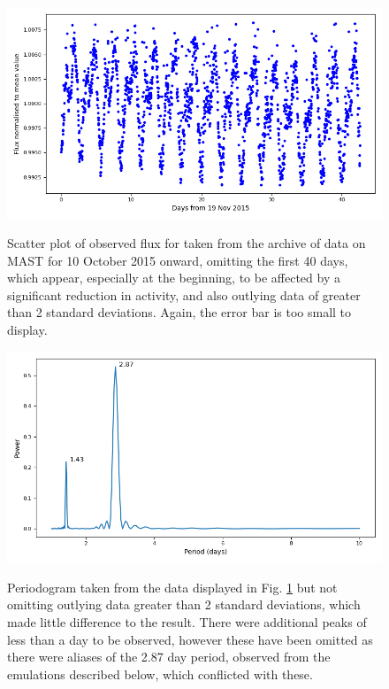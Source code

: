 \begin{figure}[!htbp]
\begin{center}
\includegraphics[scale=0.40]{k2/images/k2lcurve.png} \\
\vspace{-.5cm}
\end{center}   
\caption{Scatter plot of observed flux for {\ross} taken from the archive of
{\ktwo} data on MAST for 10 October 2015 onward, omitting the first 40 days,
which appear, especially at the beginning, to be affected by a significant
reduction in activity, and also outlying data of greater than 2 standard deviations.
Again, the error bar is too small to display.}\protect\label{fig:k2lcurve}
\end{figure}

\begin{figure}[!htbp]
\begin{center}
\includegraphics[scale=0.40]{k2/images/k2_pg.png} \\
\vspace{-.5cm}
\end{center}   
\caption{Periodogram taken from the data displayed in Fig.
\ref{fig:k2lcurve} but not omitting outlying data
greater than 2 standard deviations, which made
little difference to the result. There were additional peaks of less than a day
to be observed, however these have been omitted as there were aliases of the
2.87 day period, observed from the emulations described below, which conflicted
with these.} \protect\label{fig:k2pgram}
\end{figure}

